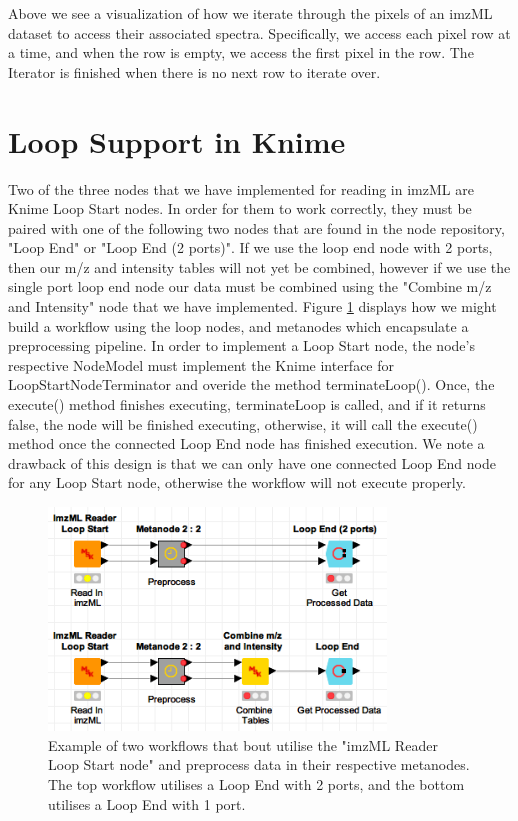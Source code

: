 \documentclass[11pt,openany]{book}
\begin{document}
Above we see a visualization of how we iterate through the pixels of an imzML dataset to access their associated spectra. Specifically, we access each pixel row at a time, and when the row is empty, we access the first pixel in the row. The Iterator is finished when there is no next row to iterate over.

\section{Loop Support in Knime}
Two of the three nodes that we have implemented for reading in imzML are Knime Loop Start nodes. In order for them to work correctly, they must be paired with one of the following two nodes that are found in the node repository, "Loop End" or "Loop End (2 ports)". If we use the loop end node with 2 ports, then our m/z and intensity tables will not yet be combined, however if we use the single port loop end node our data must be combined using the "Combine m/z and Intensity" node that we have implemented. Figure \ref{fig:loop_start_reader_nodes} displays how we might build a workflow using the loop nodes, and metanodes which encapsulate a preprocessing pipeline.
In order to implement a Loop Start node, the node's respective NodeModel must implement the Knime interface for LoopStartNodeTerminator and overide the method terminateLoop(). Once, the execute() method finishes executing, terminateLoop is called, and if it returns false, the node will be finished executing, otherwise, it will call the execute() method once the connected Loop End node has finished execution. We note a drawback of this design is that we can only have one connected Loop End node for any Loop Start node, otherwise the workflow will not execute properly. 

\begin{figure}[H]
    \centering
    \includegraphics[width=0.8\textwidth]{./images/Loop_Start_Reader_Nodes.png}
    \caption{Example of two workflows that bout utilise the "imzML Reader Loop Start node" and preprocess data in their respective metanodes. The top workflow utilises a Loop End with 2 ports, and the bottom utilises a Loop End with 1 port.}
    \label{fig:loop_start_reader_nodes}
\end{figure}
\end{document}
